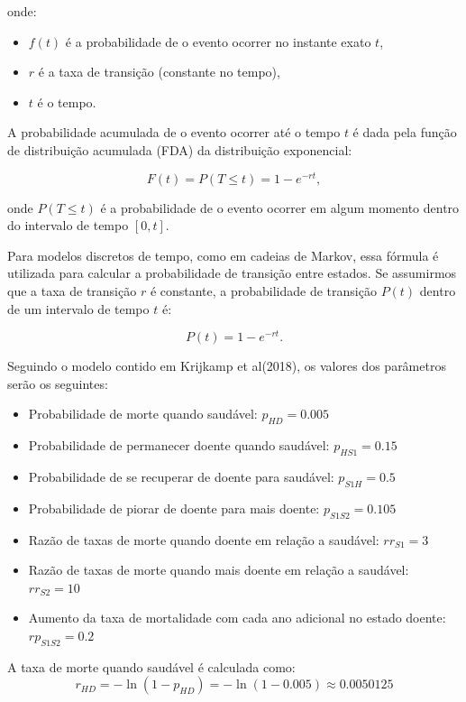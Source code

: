 \documentclass[12pt]{article}
\theoremstyle{break}
\begin{document}
onde:
\begin{itemize}
    \item \( f(t) \) é a probabilidade de o evento ocorrer no instante exato \( t \),
    \item \( r \) é a taxa de transição (constante no tempo),
    \item \( t \) é o tempo.
\end{itemize}

A probabilidade acumulada de o evento ocorrer até o tempo \( t \) é dada pela função de distribuição acumulada (FDA) da distribuição exponencial:

\[
F(t) = P(T \leq t) = 1 - e^{-r t},
\]

onde \( P(T \leq t) \) é a probabilidade de o evento ocorrer em algum momento dentro do intervalo de tempo \( [0, t] \).

Para modelos discretos de tempo, como em cadeias de Markov, essa fórmula é utilizada para calcular a probabilidade de transição entre estados. Se assumirmos que a taxa de transição \( r \) é constante, a probabilidade de transição \( P(t) \) dentro de um intervalo de tempo \( t \) é:

\[
P(t) = 1 - e^{-r t}.
\]





Seguindo o modelo contido em  Krijkamp et al(2018), os valores dos parâmetros serão os seguintes:
\begin{itemize}
    \item Probabilidade de morte quando saudável: \(p_{HD} = 0.005\)
    \item Probabilidade de permanecer doente quando saudável: \(p_{HS1} = 0.15\)
    \item Probabilidade de se recuperar de doente para saudável: \(p_{S1H} = 0.5\)
    \item Probabilidade de piorar de doente para mais doente: \(p_{S1S2} = 0.105\)
    \item Razão de taxas de morte quando doente em relação a saudável: \(rr_{S1} = 3\)
    \item Razão de taxas de morte quando mais doente em relação a saudável: \(rr_{S2} = 10\)
    \item Aumento da taxa de mortalidade com cada ano adicional no estado doente: \(rp_{S1S2} = 0.2\)
\end{itemize}

A taxa de morte quando saudável é calculada como:
\[
r_{HD} = -\ln(1 - p_{HD}) = -\ln(1 - 0.005) \approx 0.0050125
\]
\end{document}
